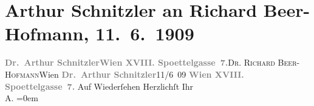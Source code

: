 

         
         \renewcommand{\erwaehntePersonen}{Personen: Richard Beer-Hofmann}
         \renewcommand{\erwaehnteOrte}{Orte: Edmund-Weiß-Gasse, Wien}
         \renewcommand{\erwaehnteWerke}{}
               \section[Arthur Schnitzler an Richard Beer-Hofmann, 11. 6. 1909]{ Arthur Schnitzler an Richard Beer-Hofmann, 11. 6. 1909}\nopagebreak{}\rehead{ }\begin{ledgroupsized}[t]{13cm}\normalsize\beginnumbering \toendnotes[C]{\smallbreak\pagebreak[2]} 
\pstart{}{\pb}\textcolor{gray}{\textbf{Dr. Arthur Schnitzler}}\pend{}\pstart{}\textcolor{gray}{\textbf{Wien XVIII. Spoettelgasse 7.}}\pend{}{\bigskip}\pstart{}{\pb}\textsc{Dr. Richard Beer-Hofmann}\pend{}\pstart{}Wien\pend{}{\bigskip}\pstart
           \noindent{}{\pb}\textcolor{gray}{\textbf{Dr. Arthur Schnitzler}}\hfill 11/6 09\pend
           \pstart
           \textcolor{gray}{\textbf{Wien XVIII. Spoettelgasse 7.}}\pend
           \pstart
           Auf Wiederſehen \pend
           \pstart
           Herzlichſt Ihr{\\[\baselineskip]}\spacefill\mbox{A.}\pend
           \leftskip=0em{}
         
         \endnumbering{}\end{ledgroupsized}  \newcommand{\dateiname}{L01843}\newcommand{\titel}{Arthur Schnitzler an Richard Beer-Hofmann, 11. 6. 1909}\newcommand{\editorInnen}{Martin Anton Müller und Gerd-Hermann Susen}
      